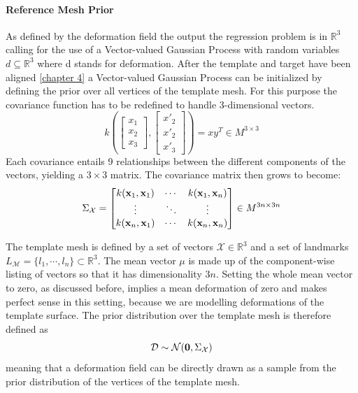 \paragraph{Reference Mesh Prior}
As defined by the deformation field the output the regression problem is in $\mathbb{R}^3$ calling for the use of a Vector-valued Gaussian Process with random variables $d \subseteq \mathbb{R}^3$ where d stands for deformation. 
After the template and target have been aligned \ref{chapter 4} a Vector-valued Gaussian Process can be initialized by defining the prior over all vertices of the template mesh. For this purpose the covariance function has to be redefined to handle 3-dimensional vectors.
\begin{equation}
    k\left(
    \begin{bmatrix}x_{1}\\x_{2}\\x_{3}\end{bmatrix},
    \begin{bmatrix}x'_{2}\\x'_{2}\\x'_{3}\end{bmatrix}
    \right) = x y^T \in M^{3 \times 3}
\end{equation}
Each covariance entails 9 relationships between the different components of the vectors, yielding a $3 \times 3$ matrix. The covariance matrix then grows to become: 
\begin{equation}
    \Sigma_{\mathcal{X}} = 
\begin{bmatrix}
    k(\textbf{x}_{1},\textbf{x}_{1}) & \cdots & k(\textbf{x}_{1},\textbf{x}_{n}) \\
\vdots & \ddots & \vdots \\
k(\textbf{x}_{n},\textbf{x}_{1}) & \cdots & k(\textbf{x}_{n},\textbf{x}_{n})
\end{bmatrix} \in M^{3n \times 3n}
\end{equation}

The template mesh is defined by a set of vectors $\mathcal{X} \in \mathbb{R}^3$ and a set of landmarks $L_\mathcal{M}=\{l_{1}, \cdots, l_{n}\} \subset \mathbb{R}^3$.
The mean vector $\mu$ is made up of the component-wise listing of vectors so that it has dimensionality $3n$. Setting the whole mean vector to zero, as discussed before, implies a mean deformation of zero and makes perfect sense in this setting, because we are modelling deformations of the template surface. 
The prior distribution over the template mesh is therefore defined as 
\begin{equation}
    \mathcal{D} \sim \mathcal{N}(\textbf{0}, \Sigma_{\mathcal{X}})
\end{equation}
meaning that a deformation field can be directly drawn as a sample from the prior distribution of the vertices of the template mesh. 

